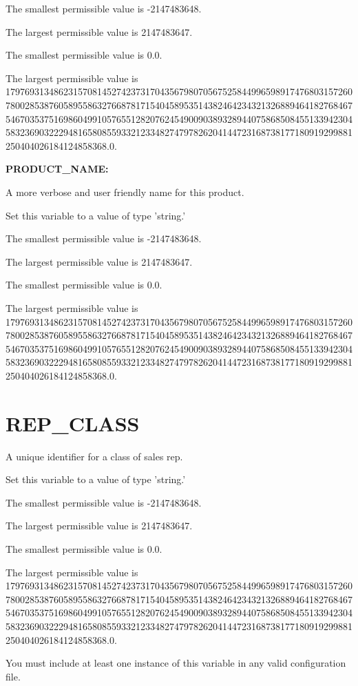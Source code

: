 The smallest permissible value is -2147483648.

The largest permissible value is 2147483647.

The smallest permissible value is 0.0.

The largest permissible value is 179769313486231570814527423731704356798070567525844996598917476803157260780028538760589558632766878171540458953514382464234321326889464182768467546703537516986049910576551282076245490090389328944075868508455133942304583236903222948165808559332123348274797826204144723168738177180919299881250404026184124858368.0.


\textbf{PRODUCT\_NAME:}


A more verbose and user friendly name for this product.

Set this variable to a value of type 'string.'

The smallest permissible value is -2147483648.

The largest permissible value is 2147483647.

The smallest permissible value is 0.0.

The largest permissible value is 179769313486231570814527423731704356798070567525844996598917476803157260780028538760589558632766878171540458953514382464234321326889464182768467546703537516986049910576551282076245490090389328944075868508455133942304583236903222948165808559332123348274797826204144723168738177180919299881250404026184124858368.0.


\section{REP\_CLASS}


A unique identifier for a class of sales rep.

Set this variable to a value of type 'string.'

The smallest permissible value is -2147483648.

The largest permissible value is 2147483647.

The smallest permissible value is 0.0.

The largest permissible value is 179769313486231570814527423731704356798070567525844996598917476803157260780028538760589558632766878171540458953514382464234321326889464182768467546703537516986049910576551282076245490090389328944075868508455133942304583236903222948165808559332123348274797826204144723168738177180919299881250404026184124858368.0.

You must include at least one instance of this variable in any valid configuration file.

